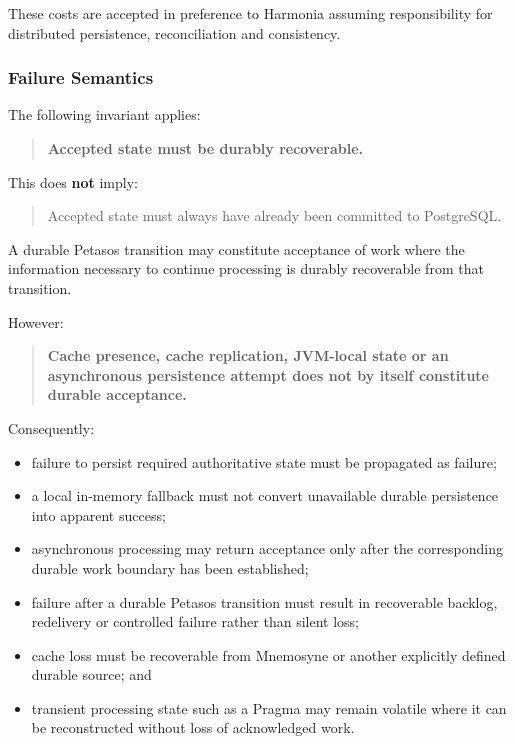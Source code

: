 These costs are accepted in preference to Harmonia assuming responsibility for distributed persistence, reconciliation and consistency.

\subsubsection{Failure Semantics}

The following invariant applies:

\begin{quote}
    \textbf{Accepted state must be durably recoverable.}
\end{quote}

This does \textbf{not} imply:

\begin{quote}
    Accepted state must always have already been committed to PostgreSQL.
\end{quote}

A durable Petasos transition may constitute acceptance of work where the information necessary to continue processing is durably recoverable from that transition.

However:

\begin{quote}
    \textbf{Cache presence, cache replication, JVM-local state or an asynchronous persistence attempt does not by itself constitute durable acceptance.}
\end{quote}

Consequently:
\begin{itemize}
    \item failure to persist required authoritative state must be propagated as failure;
    \item a local in-memory fallback must not convert unavailable durable persistence into apparent success;
    \item asynchronous processing may return acceptance only after the corresponding durable work boundary has been established;
    \item failure after a durable Petasos transition must result in recoverable backlog, redelivery or controlled failure rather than silent loss;
    \item cache loss must be recoverable from Mnemosyne or another explicitly defined durable source; and
    \item transient processing state such as a Pragma may remain volatile where it can be reconstructed without loss of acknowledged work.
\end{itemize}


